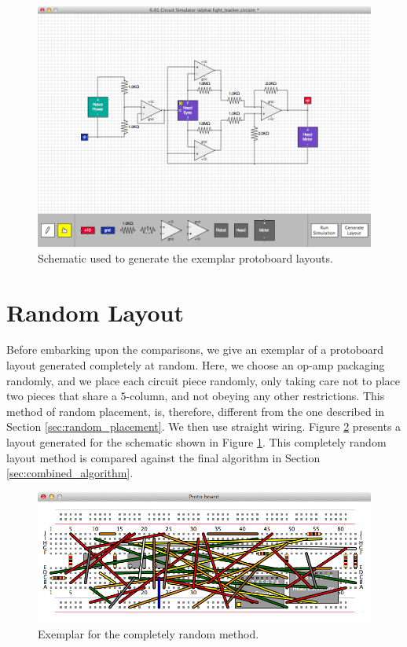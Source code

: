 \begin{figure}
\begin{center}
\includegraphics[width=\textwidth]{Images/exemplar_schematic.png}
\caption[Exemplar schematic]{Schematic used to generate the exemplar protoboard
layouts.}
\label{fig:exemplar_schematic}
\end{center}
\end{figure}

\section{Random Layout}
\label{sec:random_layout}

Before embarking upon the comparisons, we give an exemplar of a protoboard
layout generated completely at random. Here, we choose an op-amp packaging
randomly, and we place each circuit piece randomly,
only taking care not to place two pieces that share a $5$-column, and
not obeying any other restrictions. This method of random placement, is,
therefore, different from the one described in Section
\ref{sec:random_placement}. We then use straight wiring. Figure
\ref{fig:completely_random} presents a layout generated for the schematic
shown in Figure \ref{fig:exemplar_schematic}. This completely random layout
method is compared against the final algorithm in Section
\ref{sec:combined_algorithm}.

\begin{figure}[H]
\begin{center}
\includegraphics[width=\textwidth]{Images/exemplar_completely_random.png}
\caption[Random layout exemplar]{Exemplar for the completely random method.}
\label{fig:completely_random}
\end{center}
\end{figure}

